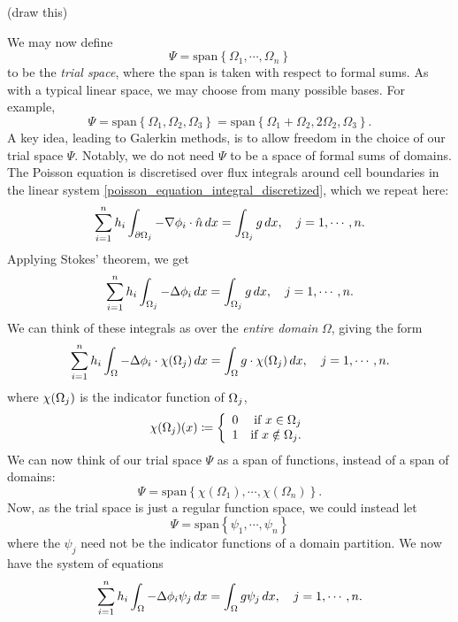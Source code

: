 \vskip 0.2in
(draw this)
\vskip 0.2in

We may now define
    $$\Psi = \text{span}\left\{\Omega_1,\cdots,\Omega_n\right\}$$
to be the \textit{trial space}, where the span is taken with respect to formal sums. As with a typical linear space,
we may choose from many possible bases. For example,
    $$\Psi = \text{span}\left\{\Omega_1, \Omega_2, \Omega_3\right\} =
    \text{span}\left\{\Omega_1 + \Omega_2, 2\Omega_2, \Omega_3\right\}.$$
A key idea, leading to Galerkin methods, is to allow freedom in the choice of our trial space $\Psi$.
Notably, we do not need $\Psi$ to be a space of formal sums of domains.
The Poisson equation is discretised over flux integrals around cell boundaries in the linear system \eqref{poisson_equation_integral_discretized},
which we repeat here:
\begin{align*}
    \sum_{i=1}^n h_i\int_{{\partial\Omega}_j} -\nabla \phi_i \cdot \hat{n}\,dx = \int_{{\Omega}_j} g\,dx,\quad j=1,\cdots,n.
\end{align*}
Applying Stokes' theorem, we get
\begin{align*}
    \sum_{i=1}^n h_i\int_{{\Omega}_j} -\Delta \phi_i \,dx = \int_{{\Omega}_j} g\,dx,\quad j=1,\cdots,n.
\end{align*}
We can think of these integrals as over the \textit{entire domain} $\Omega$, giving the form
\begin{align*}
    \sum_{i=1}^n h_i\int_{{\Omega}} -\Delta \phi_i\cdot \chi({\Omega}_j)\,dx = \int_{{\Omega}} g\cdot\chi({\Omega}_j)\,dx,\quad j=1,\cdots,n.
\end{align*}
where $\chi({\Omega}_j)$ is the indicator function of ${\Omega}_j$,
\begin{align*}
    \chi({\Omega}_j)(x) \coloneqq \left\{\begin{array}{lr}
        0 &\text{if $x \in {\Omega}_j$}\\
        1 &\text{if $x \notin {\Omega}_j$.}\\
        \end{array}\right.
\end{align*}
We can now think of our trial space $\Psi$ as a span of functions, instead of a span of domains:
    $$\Psi = \text{span}\left\{\chi(\Omega_1),\cdots,\chi(\Omega_n)\right\}.$$
Now, as the trial space is just a regular function space, we could instead let
    $$\Psi = \text{span}\left\{\psi_1,\cdots,\psi_n\right\}$$
where the $\psi_j$
need not be the indicator functions of a domain partition. We now have the system of equations
\begin{align*}
    \sum_{i=1}^n h_i\int_{{\Omega}} -\Delta \phi_i \psi_j\,dx = \int_{{\Omega}} g\psi_j\,dx,\quad j=1,\cdots,n.
\end{align*}
